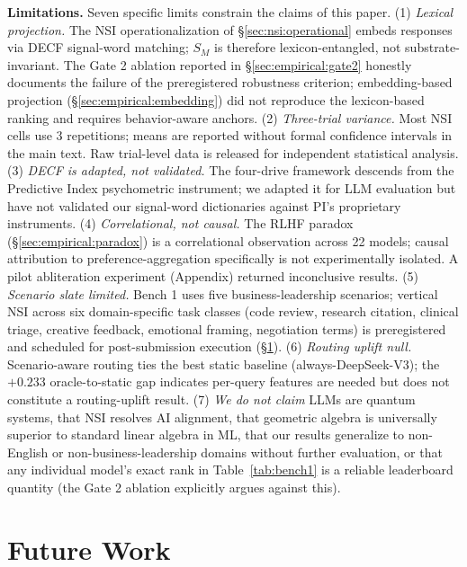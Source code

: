 \documentclass{article}
\begin{document}
\textbf{Limitations.} Seven specific limits constrain the claims of this paper. (1) \emph{Lexical projection.} The NSI operationalization of \S\ref{sec:nsi:operational} embeds responses via DECF signal-word matching; $S_M$ is therefore lexicon-entangled, not substrate-invariant. The Gate 2 ablation reported in \S\ref{sec:empirical:gate2} honestly documents the failure of the preregistered robustness criterion; embedding-based projection (\S\ref{sec:empirical:embedding}) did not reproduce the lexicon-based ranking and requires behavior-aware anchors. (2) \emph{Three-trial variance.} Most NSI cells use 3 repetitions; means are reported without formal confidence intervals in the main text. Raw trial-level data is released for independent statistical analysis. (3) \emph{DECF is adapted, not validated.} The four-drive framework descends from the Predictive Index psychometric instrument; we adapted it for LLM evaluation but have not validated our signal-word dictionaries against PI's proprietary instruments. (4) \emph{Correlational, not causal.} The RLHF paradox (\S\ref{sec:empirical:paradox}) is a correlational observation across 22 models; causal attribution to preference-aggregation specifically is not experimentally isolated. A pilot abliteration experiment (Appendix) returned inconclusive results. (5) \emph{Scenario slate limited.} Bench 1 uses five business-leadership scenarios; vertical NSI across six domain-specific task classes (code review, research citation, clinical triage, creative feedback, emotional framing, negotiation terms) is preregistered and scheduled for post-submission execution (\S\ref{sec:future}). (6) \emph{Routing uplift null.} Scenario-aware routing ties the best static baseline (always-DeepSeek-V3); the $+0.233$ oracle-to-static gap indicates per-query features are needed but does not constitute a routing-uplift result. (7) \emph{We do not claim} LLMs are quantum systems, that NSI resolves AI alignment, that geometric algebra is universally superior to standard linear algebra in ML, that our results generalize to non-English or non-business-leadership domains without further evaluation, or that any individual model's exact rank in Table~\ref{tab:bench1} is a reliable leaderboard quantity (the Gate 2 ablation explicitly argues against this).

\section{Future Work}
\label{sec:future}
\end{document}
